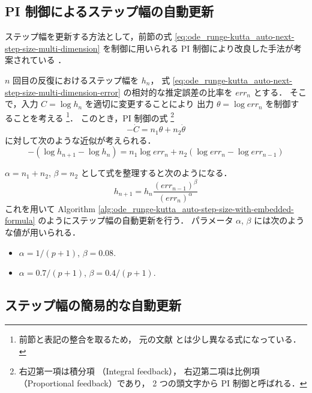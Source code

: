 \subsection{PI 制御によるステップ幅の自動更新}

ステップ幅を更新する方法として，前節の式
\eqref{eq:ode_runge-kutta_auto-next-step-size-multi-dimension}
を制御に用いられる PI 制御により改良した手法が考案されている
\cite[Section IV.2]{Hairer1991}．

$n$ 回目の反復におけるステップ幅を $h_n$，
式 \eqref{eq:ode_runge-kutta_auto-next-step-size-multi-dimension-error}
の相対的な推定誤差の比率を $err_n$ とする．
そこで，入力 $C = \log{h_n}$ を適切に変更することにより
出力 $\theta = \log{err_n}$ を制御することを考える
\footnote{前節と表記の整合を取るため，%
    元の文献 \cite[Section IV.2]{Hairer1991} とは少し異なる式になっている．}．
このとき，PI 制御の式
\footnote{右辺第一項は積分項 （Integral feedback），%
    右辺第二項は比例項（Proportional feedback）であり，%
    2 つの頭文字から PI 制御と呼ばれる．}
\begin{equation}
    -\dot{C} = n_1 \theta + n_2 \dot{\theta}
\end{equation}
に対して次のような近似が考えられる．
\begin{equation}
    -(\log{h_{n+1}} - \log{h_n}) = n_1 \log{err_n} + n_2 (\log{err_{n}} - \log{err_{n-1}})
\end{equation}

$\alpha = n_1 + n_2$, $\beta = n_2$ として式を整理すると次のようになる．
\begin{equation}
    h_{n+1} = h_n \frac{(err_{n-1})^\beta}{(err_n)^\alpha}
    \label{eq:ode_runge-kutta_auto-next-step-size-pi}
\end{equation}
これを用いて
Algorithm \ref{alg:ode_runge-kutta_auto-step-size-with-embedded-formula}
のようにステップ幅の自動更新を行う．
パラメータ $\alpha$, $\beta$ には次のような値が用いられる．
\begin{itemize}
    \item $\alpha = 1 / (p + 1)$, $\beta = 0.08$. \cite[Section IV.2]{Hairer1991}
    \item $\alpha = 0.7 / (p + 1)$, $\beta = 0.4 / (p + 1)$. \cite{Gustafsson1991}
\end{itemize}

\subsection{ステップ幅の簡易的な自動更新}

